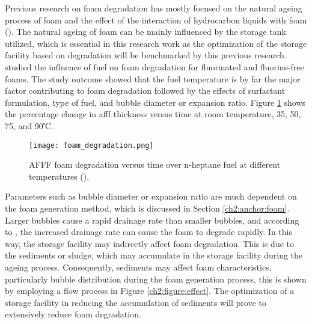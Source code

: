 Previous research on foam degradation has mostly focused on the natural ageing process of foam and the effect of the interaction of hydrocarbon liquids with foam (\cite{osei2015foam, do2011numerical}).  The natural ageing of foam can be mainly influenced by the storage tank utilized, which is essential in this research work as the optimization of the storage facility based on degradation will be benchmarked by this previous research. \cite{hinnant2017influence} studied the influence of fuel on foam degradation for fluorinated and fluorine-free foams. The study outcome showed that the fuel temperature is by far the major factor contributing to foam degradation followed by the effects of surfactant formulation, type of fuel, and bubble diameter or expansion ratio. Figure \ref{ch2:figure:degradation} shows the percentage change in \acrshort{afff} thickness versus time at room temperature, 35, 50, 75, and 90℃.

\begin{figure}[H]
    \centering
    \texttt{[image: foam\_degradation.png]}
    \caption{AFFF foam degradation versus time over n-heptane fuel at different temperatures (\cite{hinnant2017influence}).}
    \label{ch2:figure:degradation}
\end{figure}

Parameters such as bubble diameter or expansion ratio are much dependent on the foam generation method, which is discussed in Section \ref{ch2:anchor:foam}. Larger bubbles cause a rapid drainage rate than smaller bubbles, and according to \cite{hinnant2017influence}, the increased drainage rate can cause the foam to degrade rapidly. In this way, the storage facility may indirectly affect foam degradation. This is due to the sediments or sludge, which may accumulate in the storage facility during the ageing process. Consequently, sediments may affect foam characteristics, particularly bubble distribution during the foam generation process, this is shown by employing a flow process in Figure \ref{ch2:figure:effect}. The optimization of a storage facility in reducing the accumulation of sediments will prove to extensively reduce foam degradation.

